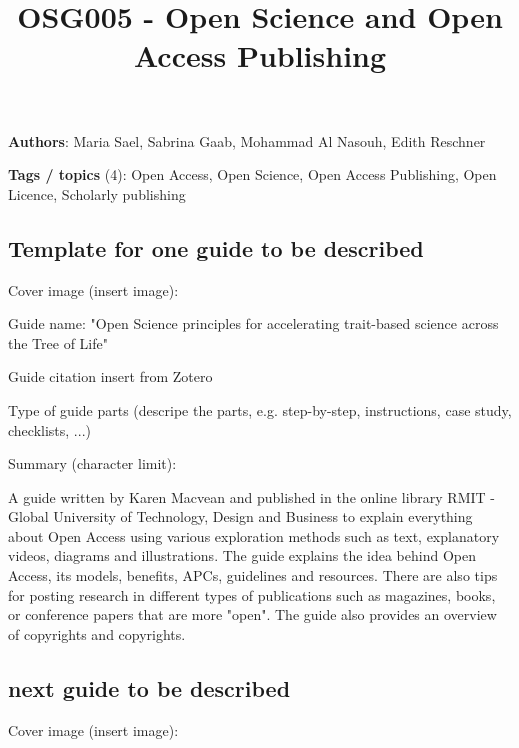 \documentclass{article}
\begin{document}
\title{OSG005 - Open Science and Open Access Publishing }

\maketitle





\textbf{Authors}:  Maria Sael, Sabrina Gaab, Mohammad Al Nasouh, Edith Reschner


\textbf{Tags / topics} (4): Open Access, Open Science, Open Access Publishing, Open Licence, Scholarly publishing


\subsection{Template for one guide to be described}\label{H7151279}



Cover image (insert image): 





Guide name: "Open Science principles for accelerating trait-based science across the Tree of Life"


Guide citation insert from Zotero  


Type of guide parts (descripe the parts, e.g. step-by-step, instructions, case study, checklists, ...)


Summary (character limit): 


A guide written by Karen Macvean and published in the online library RMIT - Global University of Technology, Design and Business to explain everything about Open Access using various exploration methods such as text, explanatory videos, diagrams and illustrations. The guide explains the idea behind Open Access, its models, benefits, APCs, guidelines and resources. There are also tips for posting research in different types of publications such as magazines, books, or conference papers that are more "open". The guide also provides an overview of copyrights and copyrights.


\autocite{open-accessnet_platform_open_nodate} 


\subsection{next guide to be described}\label{H7212092}



Cover image (insert image):
\end{document}
